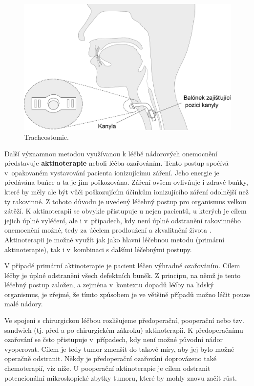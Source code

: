 \begin{figure}[htb]
  \begin{center}
    \def\svgwidth{0.9\linewidth}
    \includegraphics[width=0.9\linewidth]{ch3-cause/figures/tracheostomie}
    \caption[Tracheostomie.]{Tracheostomie.}
    \label{fig:cause:desease:tracheostomy}
  \end{center}
\end{figure}

Další významnou metodou využívanou k léčbě nádorových onemocnění představuje
\textbf{aktinoterapie} neboli léčba ozařováním. Tento postup spočívá v~opakovaném vystavování pacienta ionizujícímu záření. Jeho energie je předávána buňce a ta je jím poškozována. Záření ovšem ovlivňuje i
zdravé buňky, které by měly ale být vůči poškozujícím účinkům ionizujícího záření odolnější než ty rakovinné.
Z tohoto důvodu je uvedený léčebný postup pro organismus velkou zátěží.
K aktinoterapii se obvykle přistupuje u nejen pacientů, u kterých je cílem jejich úplné vyléčení, ale i v~případech, kdy není úplné odstranění rakovinného onemocnění možné, tedy za účelem prodloužení a zkvalitnění života \cite{Slavicek2000}. Aktinoterapii je možné využít jak jako hlavní léčebnou metodu (primární
aktinoterapie), tak i v~kombinaci s dalšími léčebnými postupy.

V případě primární aktinoterapie je pacient léčen výhradně ozařováním. Cílem léčby je úplné odstranění všech defektních
buněk. Z principu, na němž je tento léčebný postup založen, a zejména v~kontextu dopadů léčby na lidský organismus, je zřejmé, že tímto způsobem je ve většině případů možno léčit pouze malé nádory.

Ve spojení s chirurgickou léčbou rozlišujeme předoperační, pooperační nebo
tzv. sandwich (tj. před a po chirurgickém zákroku) aktinoterapii.
K předoperačnímu ozařování se čsto přistupuje v~případech, kdy není možné původní nádor vyoperovat.
Cílem je tedy tumor zmenšit do takové míry, aby jej bylo možné operačně
odstranit. Někdy je předoperační ozařování doprovázeno také chemoterapií, viz níže.
U pooperační aktinoterapie je cílem odstranit potencionální
mikroskopické zbytky tumoru, které by mohly znovu začít růst.

